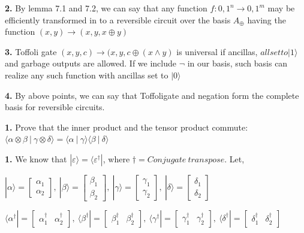 \documentclass [12pt]{article}
\theoremstyle{definition}
\newcommand{\ket}[1]{| {#1} \rangle}
\newcommand{\bra}[1]{\langle {#1} |}
\newcommand{\braket}[2]{\langle #1 \ | \ #2 \rangle}
\newcommand{\tensor}[2]{ #1 \otimes  #2 }
\begin{document}
\phantom{1em} {\bf 2.} By lemma 7.1 and 7.2, we can say that any function $f: {0,1}^{n} \rightarrow {0,1}^{m}$ may be efficiently transformed in to a reversible circuit over the basis $A_{\oplus}$ having the function $(x,y) \rightarrow (x, y, x \oplus y)$

\phantom{1em} {\bf 3.} Toffoli gate $(x, y, c) \rightarrow (x, y, c \oplus (x \wedge y)$ is universal if ancillas, $all set to \ket{1}$ and garbage outputs are allowed. If we include $\neg$ in our basis, such basis can realize any such function with ancillas set to $\ket{0}$

\phantom{1em} {\bf 4.} By above points, we can say that Toffoligate and negation form the complete basis for reversible circuits. 

\newpage

{\bf 1.} Prove that the inner product and the tensor product commute: $\braket{\tensor{\alpha}{\beta}}{\tensor{\gamma}{\delta}} = \braket{\alpha}{\gamma} \braket{\beta}{\delta}$

\phantom{1em} {\bf 1.} We know that $\ket{\varepsilon} = \bra{\varepsilon^{\dag}}$, where $\dag = Conjugate \ transpose$. Let, 

\phantom{1000em} $\ket{\alpha} = \begin{bmatrix} \alpha_{1} \\ \alpha_{2}\end{bmatrix}, \ \ket{\beta} = \begin{bmatrix} \beta_{1} \\ \beta_{2}\end{bmatrix}, \ \ket{\gamma} = \begin{bmatrix} \gamma_{1} \\ \gamma_{2}\end{bmatrix}, \ \ket{\delta} = \begin{bmatrix} \delta_{1} \\ \delta_{2}\end{bmatrix}$

\phantom{1000em} $\bra{\alpha^{\dag}} = \begin{bmatrix} \alpha^{\dag}_{1} & \alpha^{\dag}_{2}\end{bmatrix}, \ \bra{\beta^{\dag}} = \begin{bmatrix} \beta^{\dag}_{1} & \beta^{\dag}_{2}\end{bmatrix}, \ \bra{\gamma^{\dag}} = \begin{bmatrix} \gamma^{\dag}_{1} & \gamma^{\dag}_{2}\end{bmatrix}, \ \bra{\delta^{\dag}} = \begin{bmatrix} \delta^{\dag}_{1} & \delta^{\dag}_{2}\end{bmatrix}$
\end{document}
